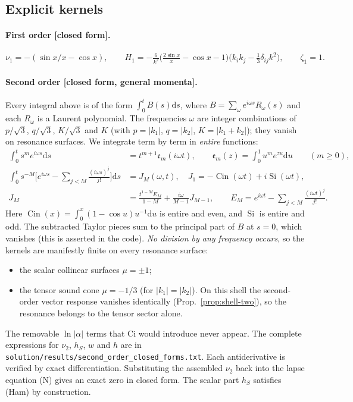 \documentclass[11pt]{article}
\theoremstyle{definition}
\theoremstyle{remark}
\newcommand{\dd}{\mathrm{d}}
\newcommand{\Cin}{\operatorname{Cin}}
\newcommand{\Si}{\operatorname{Si}}
\newcommand{\Ephi}{\mathfrak{e}}
\newcommand{\st}[1]{\textsf{[#1]}}
\newcommand{\code}[1]{\texttt{#1}}
\begin{document}
\subsection{Explicit kernels}

\paragraph{First order \st{closed form}.}
\[
\nu_1=-(\sin x/x-\cos x),\qquad
H_1=-\tfrac{6}{k^2}\big(\tfrac{2\sin x}{x}-\cos x-1\big)\big(k_ik_j-\tfrac13\delta_{ij}k^2\big),\qquad
\zeta_1=1 .
\]

\paragraph{Second order \st{closed form, general momenta}.} Every integral above is of the
form $\int_0^tB(s)\dd s$, where $B=\sum_\omega e^{i\omega s}R_\omega(s)$ and each $R_\omega$ is a
Laurent polynomial. The frequencies $\omega$ are integer combinations of $p/\sqrt3$, $q/\sqrt3$,
$K/\sqrt3$ and $K$ (with $p=|k_1|$, $q=|k_2|$, $K=|k_1+k_2|$); they vanish on resonance surfaces.
We integrate term by term in \emph{entire} functions:
\begin{align}
\int_0^t s^me^{i\omega s}\dd s&=t^{m+1}\Ephi_m(i\omega t),\qquad
\Ephi_m(z)=\int_0^1u^me^{zu}\dd u\qquad(m\ge0),\\
\int_0^t s^{-M}\Big[e^{i\omega s}-\sum_{j<M}\tfrac{(i\omega s)^j}{j!}\Big]\dd s&=J_M(\omega,t),\quad
J_1=-\Cin(\omega t)+i\Si(\omega t),\\
J_M&=\tfrac{t^{1-M}E_M}{1-M}+\tfrac{i\omega}{M-1}J_{M-1},\qquad
E_M=e^{i\omega t}-\sum_{j<M}\tfrac{(i\omega t)^j}{j!}.
\end{align}
Here $\Cin(x)=\int_0^x(1-\cos u)u^{-1}\dd u$ is entire and even, and $\Si$ is entire and odd.
The subtracted Taylor pieces sum to the principal part of $B$ at $s=0$, which vanishes (this is
asserted in the code). \emph{No division by any frequency occurs}, so the kernels are manifestly
finite on every resonance surface:
\begin{itemize}
\item the scalar collinear surfaces $\mu=\pm1$;
\item the tensor sound cone $\mu=-1/3$ (for $|k_1|=|k_2|$). On this shell the second-order
  vector response vanishes identically (Prop.~\ref{prop:shell-two}), so the resonance belongs
  to the tensor sector alone.
\end{itemize}
The removable $\ln|\alpha|$ terms that $\mathrm{Ci}$ would introduce never appear. The complete
expressions for $\nu_2$, $h_S$, $w$ and $h$ are in
\code{solution/results/second\_order\_closed\_forms.txt}. Each antiderivative is verified by exact
differentiation. Substituting the assembled $\nu_2$ back into the lapse equation (N) gives an
exact zero in closed form. The scalar part $h_S$ satisfies (Ham) by construction.
\end{document}
